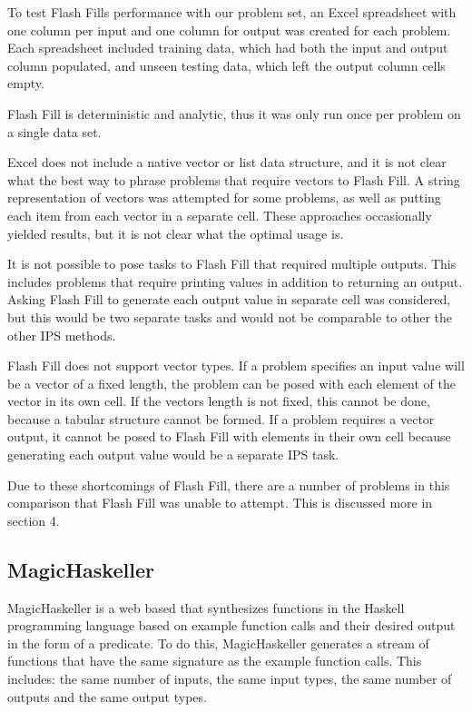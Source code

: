 To test Flash Fills performance with our problem set, an Excel spreadsheet with one column per input and one column for output was created for each problem. Each spreadsheet included training data, which had both the input and output column populated, and unseen testing data, which left the output column cells empty.

Flash Fill is deterministic and analytic, thus it was only run once per problem on a single data set.

Excel does not include a native vector or list data structure, and it is not clear what the best way to phrase problems that require vectors to Flash Fill. A string representation of vectors was attempted for some problems, as well as putting each item from each vector in a separate cell. These approaches occasionally yielded results, but it is not clear what the optimal usage is.

It is not possible to pose tasks to Flash Fill that required multiple outputs. This includes problems that require printing values in addition to returning an output. Asking Flash Fill to generate each output value in separate cell was considered, but this would be two separate tasks and would not be comparable to other the other IPS methods.

Flash Fill does not support vector types. If a problem specifies an input value will be a vector of a fixed length, the problem can be posed with each element of the vector in its own cell. If the vectors length is not fixed, this cannot be done, because a tabular structure cannot be formed. If a problem requires a vector output, it cannot be posed to Flash Fill with elements in their own cell because generating each output value would be a separate IPS task.

Due to these shortcomings of Flash Fill, there are a number of problems in this comparison that Flash Fill was unable to attempt. This is discussed more in section 4.

\subsection{MagicHaskeller}

MagicHaskeller is a web based that synthesizes functions in the Haskell programming language based on example function calls and their desired output in the form of a predicate. To do this, MagicHaskeller generates a stream of functions that have the same signature as the example function calls. This includes: the same number of inputs, the same input types, the same number of outputs and the same output types.

